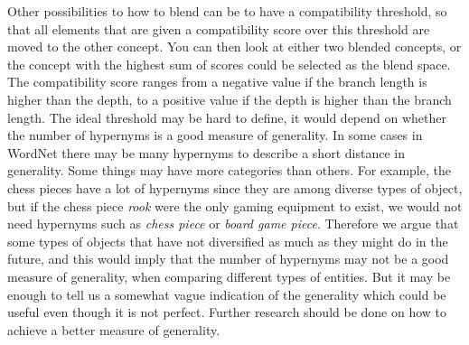 Other possibilities to how to blend can be to have a compatibility threshold, so that all elements that are given a compatibility score over this threshold are moved to the other concept. You can then look at either two blended concepts, or the concept with the highest sum of scores could be selected as the blend space. The compatibility score ranges from a negative value if the branch length is higher than the depth, to a positive value if the depth is higher than the branch length. The ideal threshold may be hard to define, it would depend on whether the number of hypernyms is a good measure of generality. In some cases in WordNet there may be many hypernyms to describe a short distance in generality. Some things may have more categories than others. For example, the chess pieces have a lot of hypernyms since they are among diverse types of object, but if the chess piece \emph{rook} were the only gaming equipment to exist, we would not need hypernyms such as \emph{chess piece} or \emph{board game piece}. Therefore we argue that some types of objects that have not diversified as much as they might do in the future, and this would imply that the number of hypernyms may not be a good measure of generality, when comparing different types of entities. But it may be enough to tell us a somewhat vague indication of the generality which could be useful even though it is not perfect. Further research should be done on how to achieve a better measure of generality.


